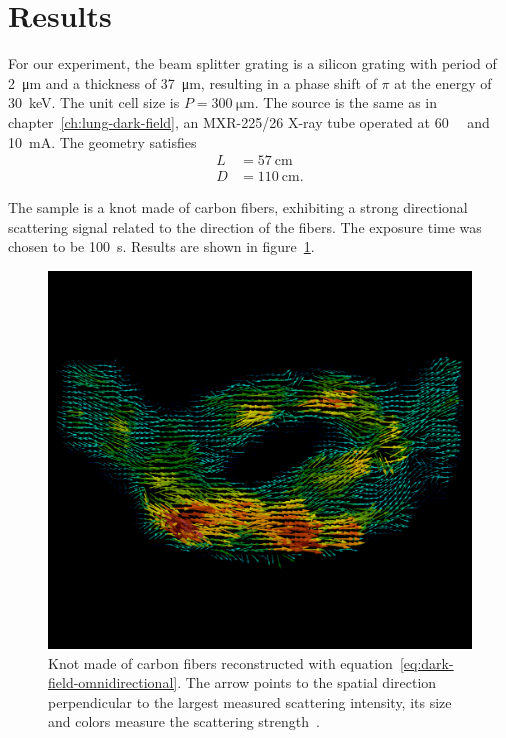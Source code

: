 \section{Results}
For our experiment, the beam splitter grating is a silicon grating with
period of \SI{2}{\micro\meter} and a thickness of \SI{37}{\micro\meter},
resulting in a phase shift of $\pi$ at the energy of \SI{30}{\kilo\eV}. The
unit cell size is $P = \SI{300}{\micro\meter}$. The
source is the same as in chapter~\ref{ch:lung-dark-field}, an MXR-225/26
X-ray tube operated at \SI{60}{\kilo\voltpeak} and \SI{10}{\milli\ampere}.
The geometry satisfies
\begin{align*}
    L &= \SI{57}{\centi\meter}\\
    D &= \SI{110}{\centi\meter}.
\end{align*}

The sample is a knot made of carbon fibers, exhibiting a strong
directional scattering signal related to the direction of the fibers. The exposure
time was chosen to be \SI{100}{\second}.
Results are shown in figure~\ref{fig:knot-reconstruction}.

\begin{figure}[htb]
    \centering
    \includegraphics[width=\textwidth]{gfx/omnidirectional/filtered.png}
    \caption[Reconstruction of a carbon fiber knot with omnidirectional
    grating interferometry.]{Knot made of carbon fibers reconstructed with
        equation~\eqref{eq:dark-field-omnidirectional}. The arrow points to
    the spatial direction perpendicular to the largest measured scattering
intensity, its size and colors measure the scattering
strength~\parencite{kagias2018omnidir}.}
    \label{fig:knot-reconstruction}
\end{figure}

